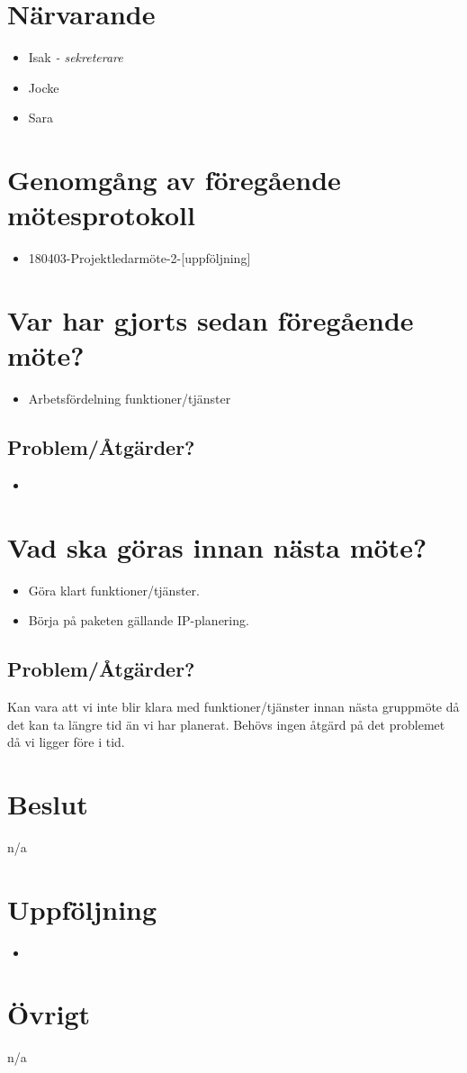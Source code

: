 
\section*{Närvarande}
\begin{itemize}[noitemsep]
    \item Isak \textit{- sekreterare}
    \item Jocke
    \item Sara
\end{itemize}

\section*{Genomgång av föregående mötesprotokoll}
\begin{itemize}[noitemsep]
    \item 180403-Projektledarmöte-2-[uppföljning]
\end{itemize}

\section*{Var har gjorts sedan föregående möte?}
\begin{itemize}[noitemsep]
    \item Arbetsfördelning funktioner/tjänster
\end{itemize}

\subsection*{Problem/Åtgärder?}
\begin{itemize}[noitemsep]
    \item 
\end{itemize}

\section*{Vad ska göras innan nästa möte?}
\begin{itemize}[noitemsep]
	\item Göra klart funktioner/tjänster.
	\item Börja på paketen gällande IP-planering.
\end{itemize}

\subsection*{Problem/Åtgärder?}
Kan vara att vi inte blir klara med funktioner/tjänster innan nästa gruppmöte då det kan ta längre tid än vi har planerat. Behövs ingen åtgärd på det problemet då vi ligger före i tid.
\section*{Beslut}
n/a

\section*{Uppföljning}
\begin{itemize}
    \item 
\end{itemize}

\section*{Övrigt}
n/a